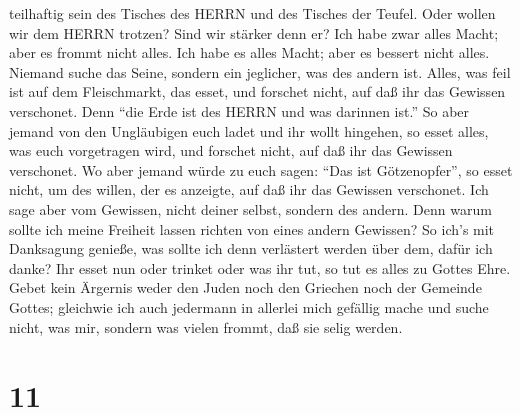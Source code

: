 teilhaftig sein des Tisches des HERRN und des Tisches der Teufel.
 Oder wollen wir dem HERRN trotzen? Sind wir stärker denn
er?  Ich habe zwar alles Macht; aber es frommt nicht alles.
Ich habe es alles Macht; aber es bessert nicht alles. 
Niemand suche das Seine, sondern ein jeglicher, was des andern ist.
 Alles, was feil ist auf dem Fleischmarkt, das esset, und
forschet nicht, auf daß ihr das Gewissen verschonet.  Denn
``die Erde ist des HERRN und was darinnen ist.''  So aber
jemand von den Ungläubigen euch ladet und ihr wollt hingehen, so esset
alles, was euch vorgetragen wird, und forschet nicht, auf daß ihr das
Gewissen verschonet.  Wo aber jemand würde zu euch sagen:
``Das ist Götzenopfer'', so esset nicht, um des willen, der es anzeigte,
auf daß ihr das Gewissen verschonet.  Ich sage aber vom
Gewissen, nicht deiner selbst, sondern des andern. Denn warum sollte ich
meine Freiheit lassen richten von eines andern Gewissen? 
So ich's mit Danksagung genieße, was sollte ich denn verlästert werden
über dem, dafür ich danke?  Ihr esset nun oder trinket oder
was ihr tut, so tut es alles zu Gottes Ehre.  Gebet kein
Ärgernis weder den Juden noch den Griechen noch der Gemeinde Gottes;
 gleichwie ich auch jedermann in allerlei mich gefällig
mache und suche nicht, was mir, sondern was vielen frommt, daß sie selig
werden.

\hypertarget{section-10}{%
\section{11}\label{section-10}}

